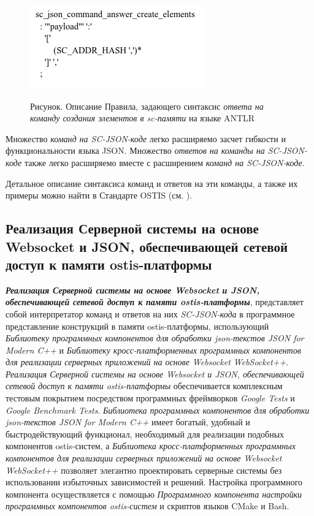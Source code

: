 \begin{figure}[H]
	\center
	\caption{Рисунок. Описание Правила, задающего синтаксис \textit{ответа на команду создания элементов в sc-памяти} на языке ANTLR}
	\includegraphics[scale=0.8]{author/part6/figures/create_elements_command_answer.png}
	\label{fig:create_elements_command_answer}
\end{figure}

Множество \textit{команд на SC-JSON-коде} легко расширяемо засчет гибкости и функциональности языка JSON. Множество \textit{ответов на команды на SC-JSON-коде} также легко расширяемо вместе с расширением \textit{команд на SC-JSON-коде}.

Детальное описание синтаксиса команд и ответов на эти команды, а также их примеры можно найти в Стандарте OSTIS (см. ).

\subsection{Реализация Серверной системы на основе Websocket и JSON, обеспечивающей сетевой доступ к памяти ostis-платформы}
\label{sec_soft_platform_sc_server}

\textbf{\textit{Реализация Серверной системы на основе Websocket и JSON, обеспечивающей сетевой доступ к памяти ostis-платформы}}, представляет собой интерпретатор команд и ответов на них \textit{SC-JSON-кода} в программное представление конструкций в памяти ostis-платформы, использующий \textit{Библиотеку программных компонентов для обработки json-текстов JSON for Modern C++} и \textit{Библиотеку кросс-платформенных программных компонентов для реализации серверных приложений на основе Websocket WebSocket++}. \textit{Реализация Серверной системы на основе Websocket и JSON, обеспечивающей сетевой доступ к памяти ostis-платформы} обеспечивается комплексным тестовым покрытием посредством программных фреймворков \textit{Google Tests} и \textit{Google Benchmark Tests}. \textit{Библиотека программных компонентов для обработки json-текстов JSON for Modern C++} имеет богатый, удобный и быстродействующий функционал, необходимый для реализации подобных компонентов ostis-систем, а \textit{Библиотека кросс-платформенных программных компонентов для реализации серверных приложений на основе Websocket WebSocket++} позволяет элегантно проектировать серверные системы без использовании избыточных зависимостей и решений. Настройка программного компонента осуществляется с помощью \textit{Программного компонента настройки программных компонентов ostis-систем} и скриптов языков CMake и Bash.

